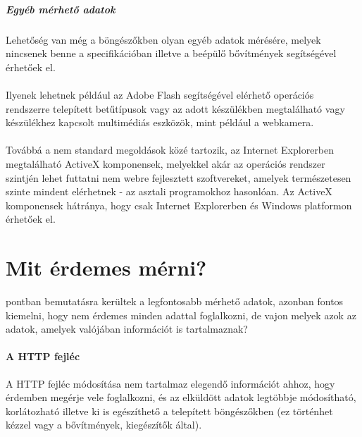 \subparagraph{Egyéb mérhető adatok} %
\label{subp:egyéb_mérhető_adatok}
Lehetőség van még a böngészőkben olyan egyéb adatok mérésére, melyek nincsenek benne a specifikációban illetve a beépülő bővítmények segítségével érhetőek el.\hfill\\\\
Ilyenek lehetnek például az Adobe Flash segítségével elérhető operációs rendszerre telepített betűtípusok vagy az adott készülékben megtalálható vagy készülékhez kapcsolt multimédiás eszközök, mint például a webkamera.\hfill\\\\
Továbbá a nem standard megoldások közé tartozik, az Internet Explorerben megtalálható ActiveX komponensek, melyekkel akár az operációs rendszer szintjén lehet futtatni nem webre fejlesztett szoftvereket, amelyek természetesen szinte mindent elérhetnek - az asztali programokhoz hasonlóan. Az ActiveX komponensek hátránya, hogy csak Internet Explorerben és Windows platformon érhetőek el.



\section{Mit érdemes mérni?} %
\label{sec:mit_érdemes_mérni_}

 pontban bemutatásra kerültek a legfontosabb mérhető adatok, azonban fontos kiemelni, hogy nem érdemes minden adattal foglalkozni, de vajon melyek azok az adatok, amelyek valójában információt is tartalmaznak?\hfill\\

\paragraph{A HTTP fejléc} %
\label{par:a_http_fejléc}
A HTTP fejléc módosítása nem tartalmaz elegendő információt ahhoz, hogy érdemben megérje vele foglalkozni, és az elküldött adatok legtöbbje módosítható, korlátozható illetve ki is egészíthető a telepített böngészőkben (ez történhet kézzel vagy a bővítmények, kiegészítők által).

